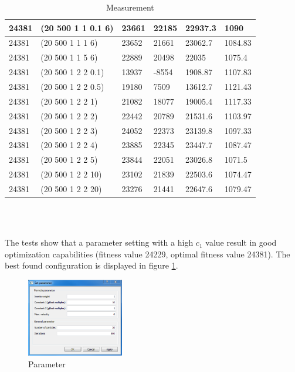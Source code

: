 \documentclass{article}
\begin{document}
\begin{table}
\begin{tabular}{|l|l|l|l|l|l|}
	24381 & (20 500 1 1 0.1 6) & 23661 & 22185 & 22937.3 & 1090 \\ \hline
	24381 & (20 500 1 1 1 6) & 23652 & 21661 & 23062.7 & 1084.83 \\ \hline
	24381 & (20 500 1 1 5 6) & 22889 & 20498 & 22035 & 1075.4 \\ \hline
	24381 & (20 500 1 2 2 0.1) & 13937 & -8554 & 1908.87 & 1107.83 \\ \hline
	24381 & (20 500 1 2 2 0.5) & 19180 & 7509 & 13612.7 & 1121.43 \\ \hline
	24381 & (20 500 1 2 2 1) & 21082 & 18077 & 19005.4 & 1117.33 \\ \hline
	24381 & (20 500 1 2 2 2) & 22442 & 20789 & 21531.6 & 1103.97 \\ \hline
	24381 & (20 500 1 2 2 3) & 24052 & 22373 & 23139.8 & 1097.33 \\ \hline
	24381 & (20 500 1 2 2 4) & 23885 & 22345 & 23447.7 & 1087.47 \\ \hline
	24381 & (20 500 1 2 2 5) & 23844 & 22051 & 23026.8 & 1071.5 \\ \hline
	24381 & (20 500 1 2 2 10) & 23102 & 21839 & 22503.6 & 1074.47 \\ \hline
	24381 & (20 500 1 2 2 20) & 23276 & 21441 & 22647.6 & 1079.47 \\ \hline
\end{tabular} \\\\
\caption{Measurement}
\end{table}

\newpage

The tests show that a parameter setting with a high $c_1$ value result in good optimization capabilities (fitness value 24229, optimal fitness value 24381). The best found configuration is displayed in figure \ref{fig-param}.

\begin{figure}[H]
    \centering
    \includegraphics[width=160px]{images/parameter.PNG}
    \caption{Parameter}
    \label{fig-param}
\end{figure}
\end{document}
